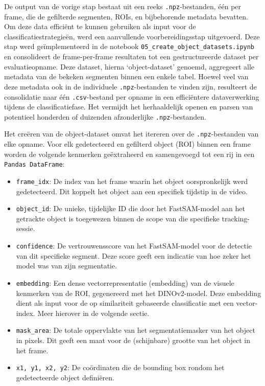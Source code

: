 De output van de vorige stap bestaat uit een reeks \texttt{.npz}-bestanden, één per frame, 
die de gefilterde segmenten, ROIs, en bijbehorende metadata bevatten. 
Om deze data efficiënt te kunnen gebruiken als input voor de classificatiestrategieën, werd een aanvullende voorbereidingsstap uitgevoerd. 
Deze stap werd geïmplementee\-rd in de notebook \texttt{05\_create\_object\_datasets.ipynb} en consolideert de frame-per-frame 
resultaten tot een gestructureerde dataset per evaluatieopname. 
Deze dataset, hierna `object-dataset' genoemd, aggregeert alle metadata van de bekeken segmenten binnen een enkele tabel.
Hoewel veel van deze metadata ook in de individuele \texttt{.npz}-bestanden te vinden zijn, resulteert de consolidatie 
naar één \texttt{.csv}-bestand per opname in een efficiëntere dataverwerking tijdens de classificatiefase. 
Het vermijdt het herhaaldelijk openen en parsen van potentieel honderden of duizenden afzonderlijke \texttt{.npz}-bestanden.

Het creëren van de object-dataset omvat het itereren over de \texttt{.npz}-bestanden van elke opname. 
Voor elk gedetecteerd en gefilterd object (ROI) binnen een frame worden de volgende kenmerken geëxtraheerd en samengevoegd tot een rij in een \texttt{Pandas DataFrame}:
\begin{itemize}
    \item \texttt{frame\_idx}: De index van het frame waarin het object oorspronkelijk werd gedetecteerd. 
    Dit koppelt het object aan een specifiek tijdstip in de video.
    \item \texttt{object\_id}: De unieke, tijdelijke ID die door het FastSAM-model aan het getrackte object 
    is toegewezen binnen de scope van die specifieke tracking-sessie.
    \item \texttt{confidence}: De vertrouwensscore van het FastSAM-model voor de detectie van dit specifieke segment. 
    Deze score geeft een indicatie van hoe zeker het model was van zijn segmentatie.
    \item \texttt{embedding}: Een dense vectorrepresentatie (embedding) van de visuele kenmerken van de ROI, 
    gegenereerd met het DINOv2-model. 
    Deze embedding dient als input voor de op similariteit gebaseerde classificatie met een vector-index.
    Meer hierover in de volgende sectie.
    \item \texttt{mask\_area}: De totale oppervlakte van het segmentatiemasker van het object in pixels. 
    Dit geeft een maat voor de (schijnbare) grootte van het object in het frame.
    \item \texttt{x1, y1, x2, y2}: De coördinaten die de bounding box rondom het gedetecteerde object definiëren. 
\end{itemize}

